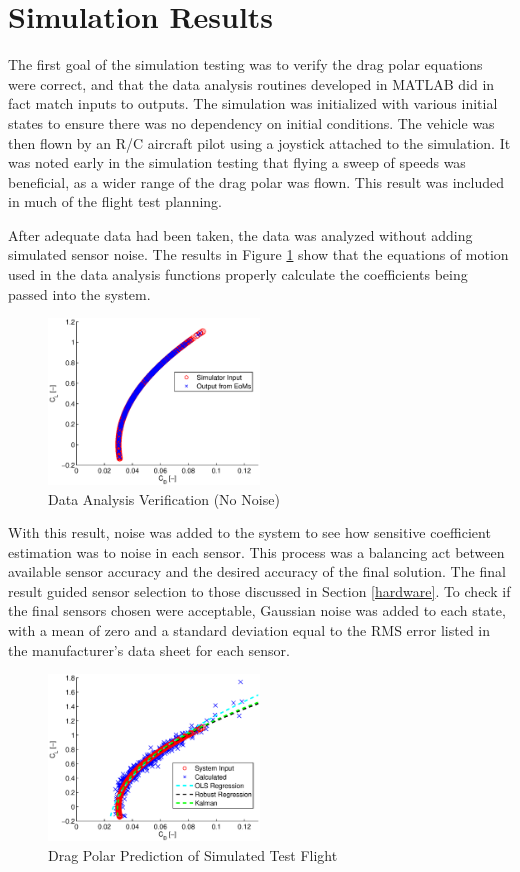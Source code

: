 \section{Simulation Results}
The first goal of the simulation testing was to verify the drag polar equations were correct, and that the data analysis routines developed in MATLAB did in fact match inputs to outputs. The simulation was initialized with various initial states to ensure there was no dependency on initial conditions. The vehicle was then flown by an R/C aircraft pilot using a joystick attached to the simulation. It was noted early in the simulation testing that flying a sweep of speeds was beneficial, as a wider range of the drag polar was flown. This result was included in much of the flight test planning. 

After adequate data had been taken, the data was analyzed without adding simulated sensor noise. The results in Figure \ref{dragPolarNoNoise} show that the equations of motion used in the data analysis functions properly calculate the coefficients being passed into the system.

\begin{figure}[H]
  \centering
    \includegraphics[width=0.5\textwidth]{figures/dragPolarNoNoise.eps}
    \caption{Data Analysis Verification (No Noise)}
        \label{dragPolarNoNoise}
\end{figure}

With this result, noise was added to the system to see how sensitive coefficient estimation was to noise in each sensor. This process was a balancing act between available sensor accuracy and the desired accuracy of the final solution. The final result guided sensor selection to those discussed in Section \ref{hardware}. To check if the final sensors chosen were acceptable, Gaussian noise was added to each state, with a mean of zero and a standard deviation equal to the RMS error listed in the manufacturer's data sheet for each sensor.
\begin{figure}[H]
  \centering
    \includegraphics[width=0.5\textwidth]{figures/simDragPolarNoise.eps}
      \caption{Drag Polar Prediction of Simulated Test Flight} \label{dragPolarNoise}
\end{figure}

